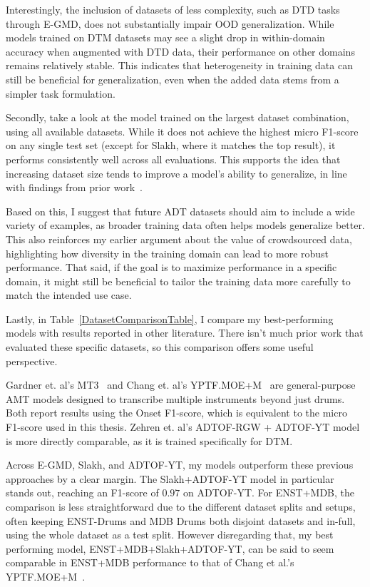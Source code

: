 Interestingly, the inclusion of datasets of less complexity, such as \gls{DTD} tasks through E-GMD, does not substantially impair \gls{OOD} generalization. While models trained on \gls{DTM} datasets may see a slight drop in within-domain accuracy when augmented with \gls{DTD} data, their performance on other domains remains relatively stable. This indicates that heterogeneity in training data can still be beneficial for generalization, even when the added data stems from a simpler task formulation.

Secondly, take a look at the model trained on the largest dataset combination, using all available datasets. While it does not achieve the highest micro F1-score on any single test set (except for Slakh, where it matches the top result), it performs consistently well across all evaluations. This supports the idea that increasing dataset size tends to improve a model's ability to generalize, in line with findings from prior work~\cite{signals4040042}. 

Based on this, I suggest that future \gls{ADT} datasets should aim to include a wide variety of examples, as broader training data often helps models generalize better. This also reinforces my earlier argument about the value of crowdsourced data, highlighting how diversity in the training domain can lead to more robust performance. That said, if the goal is to maximize performance in a specific domain, it might still be beneficial to tailor the training data more carefully to match the intended use case.

Lastly, in Table~\ref{DatasetComparisonTable}, I compare my best-performing models with results reported in other literature. There isn't much prior work that evaluated these specific datasets, so this comparison offers some useful perspective. 

Gardner et. al's MT3~\cite{gardner2022mt3multitaskmultitrackmusic} and Chang et. al's YPTF.MOE+M~\cite{chang2024yourmt3+} are general-purpose \gls{AMT} models designed to transcribe multiple instruments beyond just drums. Both report results using the Onset F1-score, which  is equivalent to the micro F1-score used in this thesis. Zehren et. al's ADTOF-RGW + ADTOF-YT model~\cite{signals4040042} is more directly comparable, as it is trained specifically for \gls{DTM}.

Across E-GMD, Slakh, and ADTOF-YT, my models outperform these previous approaches by a clear margin. The Slakh+ADTOF-YT model in particular stands out, reaching an F1-score of $0.97$ on ADTOF-YT. For ENST+MDB, the comparison is less straightforward due to the different dataset splits and setups, often keeping ENST-Drums and MDB Drums both disjoint datasets and in-full, using the whole dataset as a test split. However disregarding that, my best performing model, ENST+MDB+Slakh+ADTOF-YT, can be said to seem comparable in ENST+MDB performance to that of Chang et al.'s YPTF.MOE+M~\cite{chang2024yourmt3+}. 

